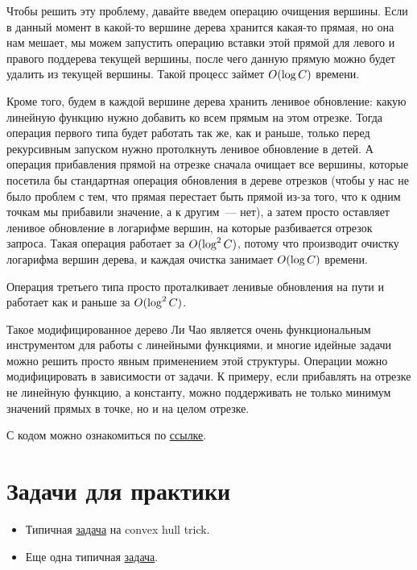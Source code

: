 Чтобы решить эту проблему, давайте введем операцию очищения вершины. Если в данный момент в какой-то вершине дерева хранится какая-то прямая, но она нам мешает, мы можем запустить операцию вставки этой прямой для левого и правого поддерева текущей вершины, после чего данную прямую можно будет удалить из текущей вершины. Такой процесс займет $O(\log C)$ времени.

Кроме того, будем в каждой вершине дерева хранить ленивое обновление: какую линейную функцию нужно добавить ко всем прямым на этом отрезке. Тогда операция первого типа будет работать так же, как и раньше, только перед рекурсивным запуском нужно протолкнуть ленивое обновление в детей. А операция прибавления прямой на отрезке сначала очищает все вершины, которые посетила бы стандартная операция обновления в дереве отрезков (чтобы у нас не было проблем с тем, что прямая перестает быть прямой из-за того, что к одним точкам мы прибавили значение, а к другим~--- нет), а затем просто оставляет ленивое обновление в логарифме вершин, на которые разбивается отрезок запроса. Такая операция работает за $O(\log^2 C)$, потому что производит очистку логарифма вершин дерева, и каждая очистка занимает $O(\log C)$ времени.

Операция третьего типа просто проталкивает ленивые обновления на пути и работает как и раньше за $O(\log^2 C)$.

Такое модифицированное дерево Ли Чао является очень функциональным инструментом для работы с линейными функциями, и многие идейные задачи можно решить просто явным применением этой структуры. Операции можно модифицировать в зависимости от задачи. К примеру, если прибавлять на отрезке не линейную функцию, а константу, можно поддерживать не только минимум значений прямых в точке, но и на целом отрезке.

С кодом можно ознакомиться по \href{https://pastebin.com/fYNWDXMj}{ссылке}.


\section{Задачи для практики}

\begin{itemize}
    \item Типичная \href{https://csacademy.com/contest/archive/task/squared-ends}{задача} на convex hull trick.

    \item Еще одна типичная \href{https://atcoder.jp/contests/dp/tasks/dp_z}{задача}.
   
\end{itemize}

